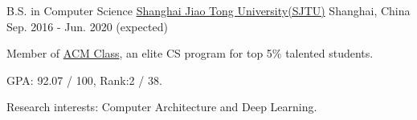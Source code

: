 \begin{cventries}
	\cventry
	{B.S. in Computer Science}
	{\href{http://en.sjtu.edu.cn/}{Shanghai Jiao Tong University(SJTU)}}
	{Shanghai, China}
	{Sep. 2016 - Jun. 2020 (expected)}
	{
		\begin{cvitems}
			\item {Member of \href{https://acm.sjtu.edu.cn}{ACM Class}, an elite CS program for top 5\% talented students.}
            \item {GPA: 92.07 / 100, Rank:2 / 38.}
            \item {Research interests: Computer Architecture and Deep Learning.}
		\end{cvitems}
	}
\end{cventries}
